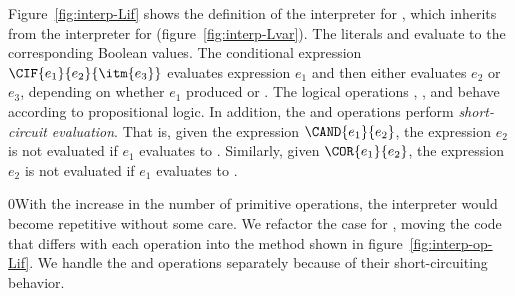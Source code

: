 \documentclass[7x10]{TimesAPriori_MIT}%
\def\racketEd{0}
\def\edition{1}
\newcommand{\racket}[1]{{\if\edition\racketEd{#1}\fi}}
\numberwithin{theorem}{chapter}
\numberwithin{definition}{chapter}
\numberwithin{equation}{chapter}
\begin{document}
Figure~\ref{fig:interp-Lif} shows the definition of the interpreter
for \LangIf{}, which inherits from the interpreter for \LangVar{}
(figure~\ref{fig:interp-Lvar}). The literals \TRUE{} and \FALSE{}
evaluate to the corresponding Boolean values. The conditional
expression $\CIF{e_1}{e_2}{\itm{e_3}}$ evaluates expression $e_1$ and
then either evaluates $e_2$ or $e_3$, depending on whether $e_1$
produced \TRUE{} or \FALSE{}. The logical operations ,
, and  behave according to propositional logic. In
addition, the  and  operations perform
\emph{short-circuit evaluation}.
%
That is, given the expression $\CAND{e_1}{e_2}$, the expression $e_2$
is not evaluated if $e_1$ evaluates to \FALSE{}.
%
Similarly, given $\COR{e_1}{e_2}$, the expression $e_2$ is not
evaluated if $e_1$ evaluates to \TRUE{}.

\racket{With the increase in the number of primitive operations, the
  interpreter would become repetitive without some care.  We refactor
  the case for \code{Prim}, moving the code that differs with each
  operation into the \code{interp\_op} method shown in
  figure~\ref{fig:interp-op-Lif}. We handle the \code{and} and
  \code{or} operations separately because of their short-circuiting
  behavior.}
\end{document}
